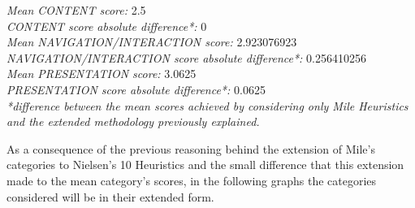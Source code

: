 \noindent \textit{Mean CONTENT score:} 2.5\\
\hspace*{2em} \textit{CONTENT score absolute difference*:} 0\\
\textit{Mean NAVIGATION/INTERACTION score:} 2.923076923\\
\hspace*{2em} \textit{NAVIGATION/INTERACTION score absolute difference*:} 0.256410256\\
\textit{Mean PRESENTATION score:} 3.0625\\
\hspace*{2em} \textit{PRESENTATION score absolute difference*:} 0.0625\\

\textit{*difference between the mean scores achieved by considering only Mile Heuristics and the extended methodology previously explained.}

\vspace{0.5cm}
As a consequence of the previous reasoning behind the extension of Mile’s categories to Nielsen’s 10 Heuristics and the small difference that this extension made to the mean category’s scores, in the following graphs the categories considered will be in their extended form.

